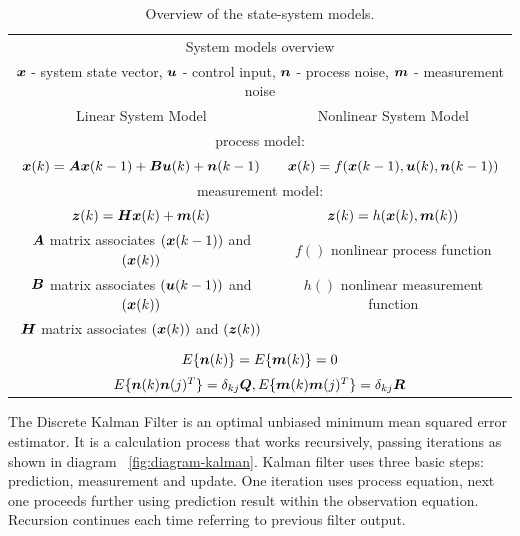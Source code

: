 \begin{table}
\centering
	\caption{Overview of the state-system models.}
	\label{tab:system}
\begin{tabular}{cc}
\toprule
\multicolumn{2}{c}{System models overview} \\
\multicolumn{2}{c}{$\boldsymbol{x}$ - system state vector, $\boldsymbol{u}$ - control input, $\boldsymbol{n}$ - process noise, $\boldsymbol{m}$ - measurement noise} \\
\midrule
\multirow{1}{*}{Linear System Model}  &  \multirow{1}{*}{Nonlinear System Model} \\
\multicolumn{2}{c}{process model:} \\
\multirow{2}{*}{$\boldsymbol{x}(k) = \boldsymbol{A}\boldsymbol{x}(k-1)+\boldsymbol{B}\boldsymbol{u}(k)+\boldsymbol{n}(k-1)$} 
									& \multirow{2}{*}{$\boldsymbol{x}(k) = f(\boldsymbol{x}(k-1),\boldsymbol{u}(k),\boldsymbol{n}(k-1))$} \\ \\
\multicolumn{2}{c}{measurement model:} \\
\multirow{2}{*}{$\boldsymbol{z}(k) = \boldsymbol{H}\boldsymbol{x}(k)+\boldsymbol{m}(k)$} 
									& \multirow{2}{*}{$\boldsymbol{z}(k) = h(\boldsymbol{x}(k),\boldsymbol{m}(k))$} \\ \\
\bottomrule
$\boldsymbol{A}$ matrix associates $(\boldsymbol{x}(k-1))$ and $(\boldsymbol{x}(k))$ & $f()$ nonlinear process function \\
$\boldsymbol{B}$ matrix associates $(\boldsymbol{u}(k-1))$ and $(\boldsymbol{x}(k))$ & $h()$ nonlinear measurement function \\
$\boldsymbol{H}$ matrix associates $(\boldsymbol{x}(k))$   and $(\boldsymbol{z}(k))$ &   \\
\\
\multicolumn{2}{c}{$E\lbrace \boldsymbol{n}(k) \rbrace = E\lbrace \boldsymbol{m}(k) \rbrace = 0$} \\ 
\multicolumn{2}{c}{$E\lbrace \boldsymbol{n}(k) \boldsymbol{n}(j)^{T} \rbrace =  \delta_{kj} \boldsymbol{Q}, E\lbrace \boldsymbol{m}(k) \boldsymbol{m}(j)^{T} \rbrace = \delta_{kj} \boldsymbol{R}$} 
\end{tabular} 
\end{table}

The Discrete Kalman Filter is an optimal unbiased minimum mean squared error estimator. It is a calculation process that works recursively, passing iterations as shown in diagram ~\ref{fig:diagram-kalman}. Kalman filter uses three basic steps: prediction, measurement and update. One iteration uses process equation, next one proceeds further using prediction result within the observation equation. Recursion continues each time referring to previous filter output.

